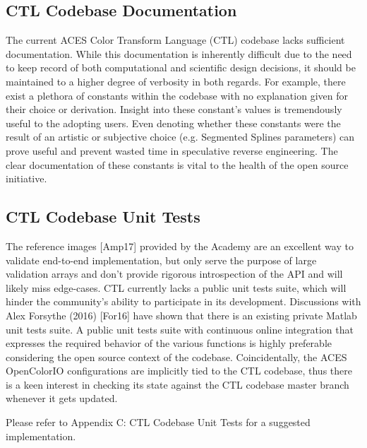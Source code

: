 \documentclass[conference]{IEEEtran}
\begin{document}
\subsection{CTL Codebase Documentation}
The current ACES Color Transform Language (CTL) codebase lacks sufficient documentation. While this documentation is inherently difficult due to the need to keep record of both computational and scientific design decisions, it should be maintained to a higher degree of verbosity in both regards. For example, there exist a plethora of constants within the codebase with no explanation given for their choice or derivation. Insight into these constant's values is tremendously useful to the adopting users. Even denoting whether these constants were the result of an artistic or subjective choice (e.g. Segmented Splines parameters) can prove useful and prevent wasted time in speculative reverse engineering. The clear documentation of these constants is vital to the health of the open source initiative.

\subsection{CTL Codebase Unit Tests}
The reference images [Amp17] provided by the Academy are an excellent way to validate end-to-end implementation, but only serve the purpose of large validation arrays and don't provide rigorous introspection of the API and will likely miss edge-cases. CTL currently lacks a public unit tests suite, which will hinder the community's ability to participate in its development. Discussions with Alex Forsythe (2016) [For16] have shown that there is an existing private Matlab unit tests suite. A public unit tests suite with continuous online integration that expresses the required behavior of the various functions is highly preferable considering the open source context of the codebase. Coincidentally, the ACES OpenColorIO configurations are implicitly tied to the CTL codebase, thus there is a keen interest in checking its state against the CTL codebase master branch whenever it gets updated.

Please refer to Appendix C: CTL Codebase Unit Tests for a suggested implementation.
\end{document}
